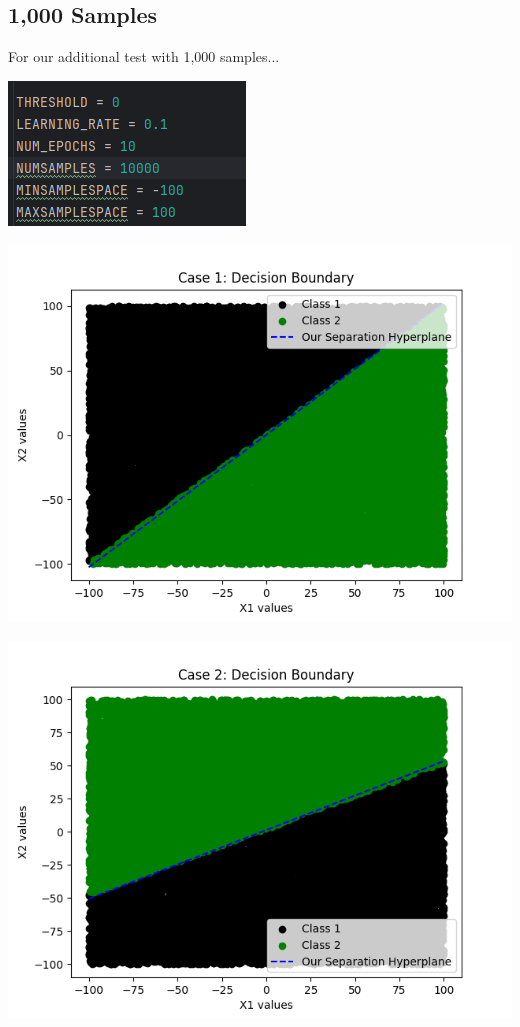 \documentclass{article}
\begin{document}
\subsection{1,000 Samples}

For our additional test with 1,000 samples...

\begin{center}
\includegraphics[scale=0.75]{../figs/P2.1.png}\\
\end{center}

\begin{center}
\includegraphics[scale=0.75]{../figs/P2.2.png}\\
\end{center}

\begin{center}
\includegraphics[scale=0.75]{../figs/P2.3.png}\\
\end{center}
\end{document}
